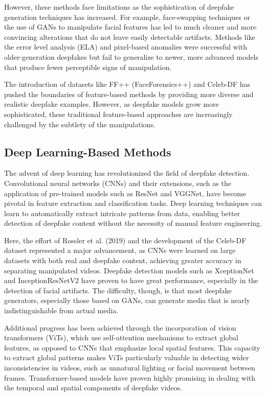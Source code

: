 \documentclass[lettersize,journal]{IEEEtran}
\begin{document}
However, these methods face limitations as the sophistication of deepfake generation techniques has increased. For example, face-swapping techniques or the use of GANs to manipulate facial features has led to much cleaner and more convincing alterations that do not leave easily detectable artifacts. Methods like the error level analysis (ELA) and pixel-based anomalies were successful with older-generation deepfakes but fail to generalize to newer, more advanced models that produce fewer perceptible signs of manipulation.

The introduction of datasets like FF++ (FaceForensics++) and Celeb-DF has pushed the boundaries of feature-based methods by providing more diverse and realistic deepfake examples. However, as deepfake models grow more sophisticated, these traditional feature-based approaches are increasingly challenged by the subtlety of the manipulations.

\subsection{Deep Learning-Based Methods}
The advent of deep learning has revolutionized the field of deepfake detection. Convolutional neural networks (CNNs) and their extensions, such as the application of pre-trained models such as ResNet and VGGNet, have become pivotal in feature extraction and classification tasks. Deep learning techniques can learn to automatically extract intricate patterns from data, enabling better detection of deepfake content without the necessity of manual feature engineering.

Here, the effort of Rossler et al. (2019) and the development of the Celeb-DF dataset represented a major advancement, as CNNs were learned on large datasets with both real and deepfake content, achieving greater accuracy in separating manipulated videos. Deepfake detection models such as XceptionNet and InceptionResNetV2 have proven to have great performance, especially in the detection of facial artifacts. The difficulty, though, is that most deepfake generators, especially those based on GANs, can generate media that is nearly indistinguishable from actual media.

Additional progress has been achieved through the incorporation of vision transformers (ViTs), which use self-attention mechanisms to extract global features, as opposed to CNNs that emphasize local spatial features. This capacity to extract global patterns makes ViTs particularly valuable in detecting wider inconsistencies in videos, such as unnatural lighting or facial movement between frames. Transformer-based models have proven highly promising in dealing with the temporal and spatial components of deepfake videos.
\end{document}

